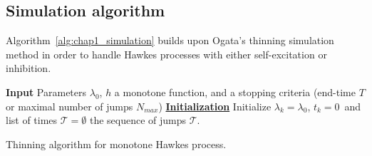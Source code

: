 \begin{subappendices}
\section{Simulation algorithm}
\label{app:chap1_simulation}

Algorithm~\ref{alg:chap1_simulation} builds upon Ogata's thinning simulation method \parencite[Proposition 1]{Ogata1981} in order to handle Hawkes processes with either self-excitation or inhibition.

\begin{algorithm}[!ht]
\SetAlgoLined
 \textbf{Input} Parameters $\lambda_0$, $h$ a monotone function, and a stopping criteria (end-time $T$ or maximal number of jumps $N_{max}$)\;
 \textbf{\underline{Initialization}} Initialize $\lambda_k =\lambda_0$, $t_k=0$\ and list of times $\mathcal{T} = \emptyset$\;
 \Return the sequence of jumps $\mathcal{T}$.
 \caption{Thinning algorithm for monotone Hawkes process.}
 \label{alg:chap1_simulation}
\end{algorithm}

\end{subappendices}